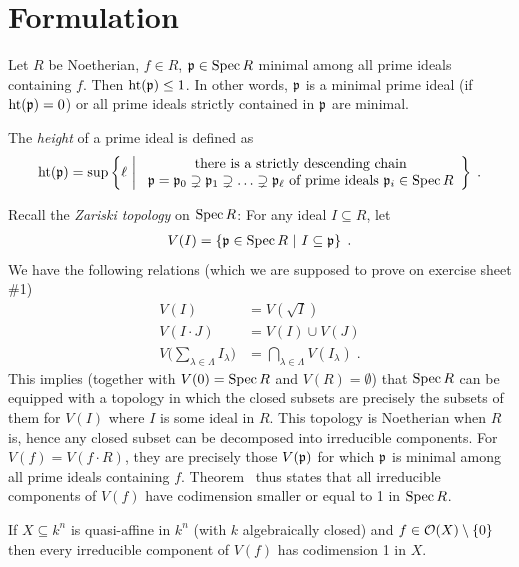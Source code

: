 \documentclass[a4paper,parskip=half,numbers=enddot, DIV=12]{scrreprt}
\begin{document}
\section{Formulation}
\setcounter{thm}{10}
\begin{thm}
    Let $R$ be Noetherian, $f\in R$, $\mathfrak{p}\in \operatorname{Spec} R$ minimal among all prime ideals containing $f$. Then $\operatorname{ht}(\mathfrak{p}) \leq 1$. In other words, $\mathfrak{p}$ is a minimal prime ideal (if $\operatorname{ht}(\mathfrak{p}) =0$) or all prime ideals strictly contained in $\mathfrak{p}$ are minimal.
\end{thm}
\begin{rem*}
    \begin{alphanumerate}
    \item
        The \emph{height} of a prime ideal is defined as
        \begin{align*}
            \operatorname{ht}(\mathfrak{p}) = \sup\left\{\ell\ \middle|\ 
            \begin{array}{c}
	            \text{there is a strictly descending chain}\\
	            \mathfrak{p}=\mathfrak{p}_0\supsetneq\mathfrak{p}_1\supsetneq\ldots\supsetneq\mathfrak{p}_\ell\text{ of prime ideals }\mathfrak{p}_i\in\operatorname{Spec} R
            \end{array}\right\}\;.
        \end{align*}
    \item
        Recall the \emph{Zariski topology} on $\operatorname{Spec} R$: For any ideal $I\subseteq R$, let 
        \begin{align*}
        	V(I) = \left\{\mathfrak{p}\in\operatorname{Spec} R\ \middle|\  I\subseteq \mathfrak{p}\right\}\;.
        \end{align*}
        We have the following relations (which we are supposed to prove on exercise sheet \#1)
        \begin{align*}
            V(I)& = V\left(\sqrt{I}\right)\\
            V(I\cdot J ) &= V(I) \cup V(J)\\
            V\bigg(\sum_{\lambda\in\Lambda} I_\lambda\bigg) &= \bigcap_{\lambda\in\Lambda} V(I_\lambda)\;.
        \end{align*}
        This implies (together with $V(0) = \operatorname{Spec} R$ and $V(R) = \emptyset$) that $\operatorname{Spec} R$ can be equipped with a topology in which the closed subsets are precisely the subsets of them for $V(I)$ where $I$ is some ideal in $R$. This topology is Noetherian when $R$ is, hence any closed subset can be decomposed into irreducible components. For $V(f) = V(f\cdot R)$, they are precisely those $V(\mathfrak{p})$ for which $\mathfrak{p}$ is minimal among all prime ideals containing $f$. Theorem~ thus states that all irreducible components of $V(f)$ have codimension smaller or equal to 1 in $\operatorname{Spec} R$. 
    \end{alphanumerate}
\end{rem*}
\begin{cor}
    If $X\subseteq k^n$ is quasi-affine in $k^n$ (with $k$ algebraically closed) and $f\in\mathcal{O}(X)\setminus\{0\}$ then every irreducible component of $V(f)$ has codimension 1 in $X$.
\end{cor}
\end{document}
